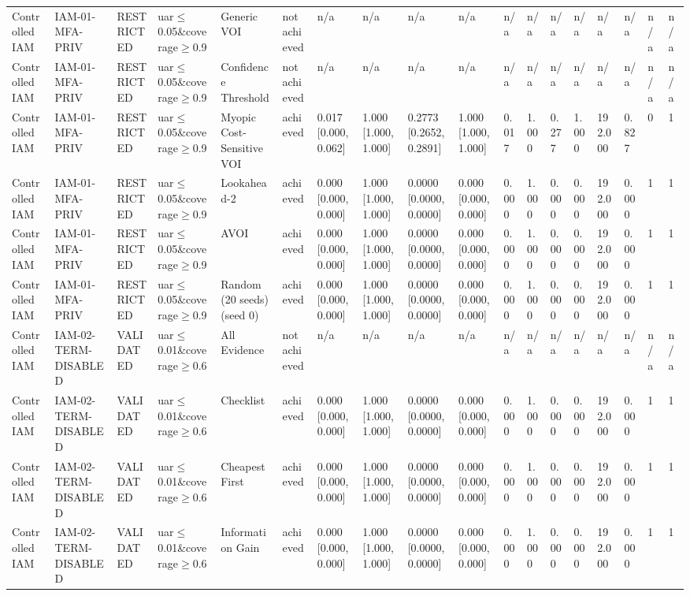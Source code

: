 \begin{table}[!ht]
{\begin{tabular}{llllllllllllllllll}
Controlled IAM & IAM-01-MFA-PRIV & RESTRICTED & uar$\le$0.05\&coverage$\ge$0.9 & Generic VOI & not achieved & n/a & n/a & n/a & n/a & n/a & n/a & n/a & n/a & n/a & n/a & n/a & n/a \\
Controlled IAM & IAM-01-MFA-PRIV & RESTRICTED & uar$\le$0.05\&coverage$\ge$0.9 & Confidence Threshold & not achieved & n/a & n/a & n/a & n/a & n/a & n/a & n/a & n/a & n/a & n/a & n/a & n/a \\
Controlled IAM & IAM-01-MFA-PRIV & RESTRICTED & uar$\le$0.05\&coverage$\ge$0.9 & Myopic Cost-Sensitive VOI & achieved & 0.017 [0.000, 0.062] & 1.000 [1.000, 1.000] & 0.2773 [0.2652, 0.2891] & 1.000 [1.000, 1.000] & 0.017 & 1.000 & 0.277 & 1.000 & 192.000 & 0.827 & 0 & 1 \\
Controlled IAM & IAM-01-MFA-PRIV & RESTRICTED & uar$\le$0.05\&coverage$\ge$0.9 & Lookahead-2 & achieved & 0.000 [0.000, 0.000] & 1.000 [1.000, 1.000] & 0.0000 [0.0000, 0.0000] & 0.000 [0.000, 0.000] & 0.000 & 1.000 & 0.000 & 0.000 & 192.000 & 0.000 & 1 & 1 \\
Controlled IAM & IAM-01-MFA-PRIV & RESTRICTED & uar$\le$0.05\&coverage$\ge$0.9 & AVOI & achieved & 0.000 [0.000, 0.000] & 1.000 [1.000, 1.000] & 0.0000 [0.0000, 0.0000] & 0.000 [0.000, 0.000] & 0.000 & 1.000 & 0.000 & 0.000 & 192.000 & 0.000 & 1 & 1 \\
Controlled IAM & IAM-01-MFA-PRIV & RESTRICTED & uar$\le$0.05\&coverage$\ge$0.9 & Random (20 seeds) (seed 0) & achieved & 0.000 [0.000, 0.000] & 1.000 [1.000, 1.000] & 0.0000 [0.0000, 0.0000] & 0.000 [0.000, 0.000] & 0.000 & 1.000 & 0.000 & 0.000 & 192.000 & 0.000 & 1 & 1 \\
Controlled IAM & IAM-02-TERM-DISABLED & VALIDATED & uar$\le$0.01\&coverage$\ge$0.6 & All Evidence & not achieved & n/a & n/a & n/a & n/a & n/a & n/a & n/a & n/a & n/a & n/a & n/a & n/a \\
Controlled IAM & IAM-02-TERM-DISABLED & VALIDATED & uar$\le$0.01\&coverage$\ge$0.6 & Checklist & achieved & 0.000 [0.000, 0.000] & 1.000 [1.000, 1.000] & 0.0000 [0.0000, 0.0000] & 0.000 [0.000, 0.000] & 0.000 & 1.000 & 0.000 & 0.000 & 192.000 & 0.000 & 1 & 1 \\
Controlled IAM & IAM-02-TERM-DISABLED & VALIDATED & uar$\le$0.01\&coverage$\ge$0.6 & Cheapest First & achieved & 0.000 [0.000, 0.000] & 1.000 [1.000, 1.000] & 0.0000 [0.0000, 0.0000] & 0.000 [0.000, 0.000] & 0.000 & 1.000 & 0.000 & 0.000 & 192.000 & 0.000 & 1 & 1 \\
Controlled IAM & IAM-02-TERM-DISABLED & VALIDATED & uar$\le$0.01\&coverage$\ge$0.6 & Information Gain & achieved & 0.000 [0.000, 0.000] & 1.000 [1.000, 1.000] & 0.0000 [0.0000, 0.0000] & 0.000 [0.000, 0.000] & 0.000 & 1.000 & 0.000 & 0.000 & 192.000 & 0.000 & 1 & 1 \\

\end{tabular}}
\end{table}
